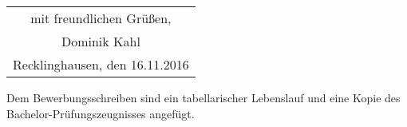 \documentclass[12pt]{scrartcl}
\begin{document}
\begin{flushright}
\begin{tabular}{c}
mit freundlichen Grüßen, 		\\[0.2cm]
Dominik Kahl 					\\[0.2cm]
Recklinghausen, den 16.11.2016 	\\[0.3cm]
\end{tabular}
\end{flushright}

Dem Bewerbungsschreiben sind ein tabellarischer Lebenslauf und eine Kopie des 
Bachelor-Prüfungszeugnisses angefügt.
\end{document}
